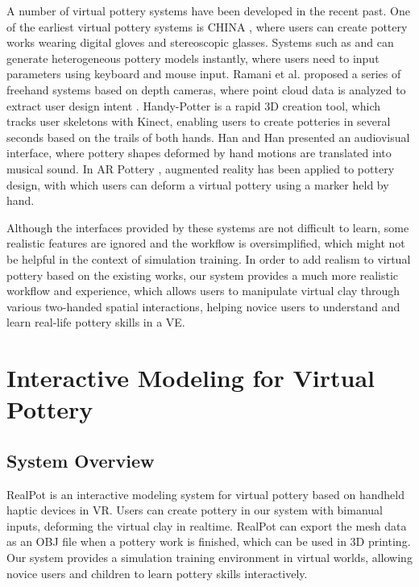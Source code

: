\documentclass{svjour3}                     %
\begin{document}
A number of virtual pottery systems have been developed in the recent past.
One of the earliest virtual pottery systems is CHINA \cite{korida1997interactive}, where users can create pottery works wearing digital gloves and stereoscopic glasses.
Systems such as \cite{koutsoudis2009qp} and \cite{kumar2011wheel} can generate heterogeneous pottery models instantly, where users need to input parameters using keyboard and mouse input.
Ramani et al. proposed a series of freehand systems based on depth cameras, where point cloud data is analyzed to extract user design intent \cite{ramani2014zpots,ramani2015gesture,ramani2016extracting}.
Handy-Potter \cite{murugappan2013handy} is a rapid 3D creation tool, which tracks user skeletons with Kinect, enabling users to create potteries in several seconds based on the trails of both hands.
Han and Han \cite{han2014virtual} presented an audiovisual interface, where pottery shapes deformed by hand motions are translated into musical sound.
In AR Pottery \cite{han2007ar}, augmented reality has been applied to pottery design, with which users can deform a virtual pottery using a marker held by hand.

Although the interfaces provided by these systems are not difficult to learn, some realistic features are ignored and the workflow is oversimplified, which might not be helpful in the context of simulation training.
%
In order to add realism to virtual pottery based on the existing works, our system provides a much {\color{blue} more} realistic workflow and experience, which allows users to manipulate virtual clay through various two-handed spatial interactions, helping novice users to understand and learn real-life pottery skills in a VE.


\section{Interactive Modeling for Virtual Pottery}
\label{sec:interactive}


\subsection{System Overview}
\label{sec:overview}
RealPot is an interactive modeling system for virtual pottery based on handheld haptic devices in VR.
Users can create pottery in our system with bimanual inputs, deforming the virtual clay in realtime.
RealPot can export the mesh data as an OBJ file when a pottery work is finished, which can be used in 3D printing.
Our system provides a simulation training environment in virtual worlds, allowing novice users and children to learn pottery skills interactively.
\end{document}
